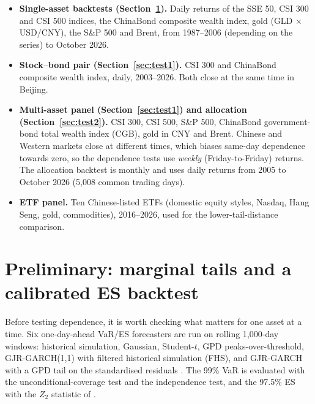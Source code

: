 \documentclass[11pt]{article}
\newcommand{\1}{\mathbf{1}}
\begin{document}
\begin{itemize}
\item \textbf{Single-asset backtests (Section~\ref{sec:marginal}).} Daily returns of the SSE 50, CSI 300 and
CSI 500 indices, the ChinaBond composite wealth index, gold (GLD $\times$ USD/CNY), the S\&P 500 and Brent,
from 1987--2006 (depending on the series) to October 2026.
\item \textbf{Stock--bond pair (Section~\ref{sec:test1}).} CSI 300 and ChinaBond composite wealth index,
daily, 2003--2026. Both close at the same time in Beijing.
\item \textbf{Multi-asset panel (Section~\ref{sec:test1}) and allocation (Section~\ref{sec:test2}).}
CSI 300, CSI 500, S\&P 500, ChinaBond government-bond total wealth index (CGB), gold in CNY and Brent.
Chinese and Western markets close at different times, which biases same-day dependence towards zero, so the
dependence tests use \emph{weekly} (Friday-to-Friday) returns. The allocation backtest is monthly and uses
daily returns from 2005 to October 2026 (5{,}008 common trading days).
\item \textbf{ETF panel.} Ten Chinese-listed ETFs (domestic equity styles, Nasdaq, Hang Seng, gold,
commodities), 2016--2026, used for the lower-tail-distance comparison.
\end{itemize}

\section{Preliminary: marginal tails and a calibrated ES backtest}
\label{sec:marginal}

Before testing dependence, it is worth checking what matters for one asset at a time. Six one-day-ahead
VaR/ES forecasters are run on rolling 1{,}000-day windows: historical simulation, Gaussian, Student-$t$,
GPD peaks-over-threshold, GJR-GARCH(1,1) with filtered historical simulation (FHS), and GJR-GARCH with a GPD
tail on the standardised residuals \citep[GARCH-EVT;][]{mcneil2000,glosten1993}. The 99\% VaR is evaluated
with the \citet{kupiec1995} unconditional-coverage test and the \citet{christoffersen1998} independence test,
and the 97.5\% ES with the $Z_2$ statistic of \citet{acerbi2014}.
\end{document}
